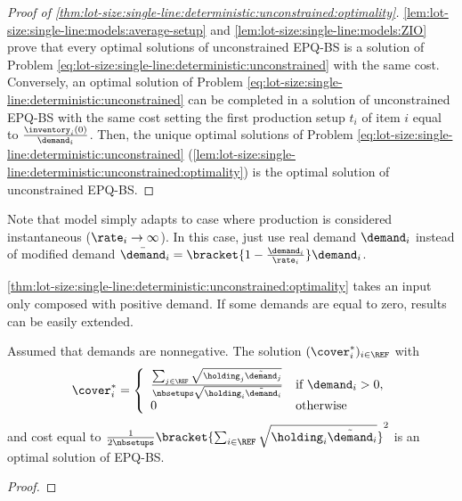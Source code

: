 \begin{proof}[Proof of \cref{thm:lot-size:single-line:deterministic:unconstrained:optimality}]
\cref{lem:lot-size:single-line:models:average-setup} and \cref{lem:lot-size:single-line:models:ZIO} prove that every optimal solutions of unconstrained EPQ-BS is a solution of Problem \ref{eq:lot-size:single-line:deterministic:unconstrained} with the same cost.
Conversely, an optimal solution of Problem \ref{eq:lot-size:single-line:deterministic:unconstrained} can be completed in a solution of unconstrained EPQ-BS with the same cost setting the first production setup $t_i$ of item $i$ equal to $\frac{\inventory_i(0)}{\demand_i}$.
Then, the unique optimal solutions of Problem \ref{eq:lot-size:single-line:deterministic:unconstrained} (\cref{lem:lot-size:single-line:deterministic:unconstrained:optimality}) is the optimal solution of unconstrained EPQ-BS.
\end{proof}


\medskip


Note that model simply adapts to case where production is considered instantaneous (\ie $\rate_i\rightarrow\infty$).
In this case, just use real demand $\demand_i$ instead of modified demand $\bar{\demand}_i=\bracket{1-\frac{\demand_i}{\rate_i}}\demand_i$.


\medskip


\cref{thm:lot-size:single-line:deterministic:unconstrained:optimality} takes an input only composed with positive demand.
If some demands are equal to zero, results can be easily extended.


\begin{cor}\label{cor:lot-size:single-line:stochastic:unconstrained:optimality}
Assumed that demands are nonnegative.
The solution $(\cover_i^*)_{i\in\REF}$ with
\begin{equation}
\cover_i^*=
\left\{
\begin{array}{ll}
\frac{\sum_{j\in\REF}\sqrt{\holding_j\tilde{\demand}_j}}{\nbsetups\sqrt{\holding_i\tilde{\demand}_i}}
&
\mbox{if}\ \demand_i>0,
\\
0 & \mbox{otherwise}
\end{array}
\right.
\end{equation}
and cost equal to $\frac{1}{2\nbsetups}\bracket{\sum_{i\in\REF}\sqrt{\holding_i\tilde{\demand}_i}}^2$ is an optimal solution of EPQ-BS.
\end{cor}


\begin{proof}

\end{proof}



